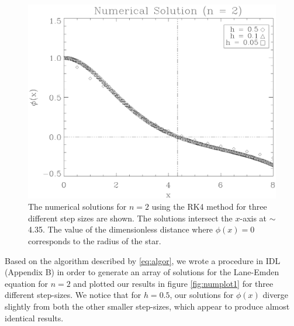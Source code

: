 \documentclass[12pt, manuscript]{article}
\begin{document}
    \begin{figure}[H]
        \begin{center}
            \includegraphics[scale=0.58]{images/rk4plot.eps}
            \caption{The numerical solutions for $n = 2$ using the RK4 method for three different step sizes are shown. The solutions intersect the $x$-axis at $\sim$ 4.35. The value of the dimensionless distance where $\phi(x) = 0$ corresponds to the radius of the star.}
            \label{fig:numplot1}
        \end{center}
    \end{figure}
    Based on the algorithm described by \eqref{eq:algor}, we wrote a procedure in IDL (Appendix B) in order to generate an array of solutions for the Lane-Emden equation for $n = 2$ and plotted our results in figure \eqref{fig:numplot1} for three different step-sizes. We notice that for $h = 0.5$, our solutions for $\phi(x)$ diverge slightly from both the other smaller step-sizes, which appear to produce almost identical results. 
\end{document}
